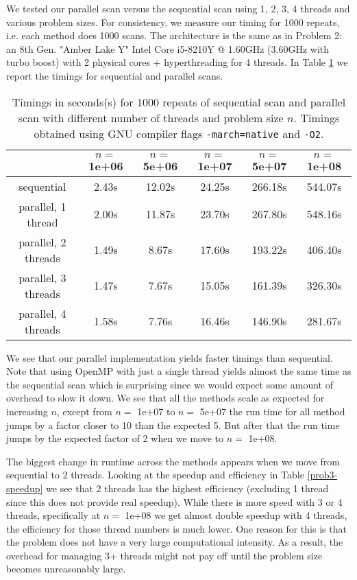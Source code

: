 \documentclass[10pt]{article}
\begin{document}
\begin{enumerate}
We tested our parallel scan versus the sequential scan using 1, 2, 3, 4 threads and various problem sizes. For consistency, we measure our timing for 1000 repeats, i.e. each method does 1000 scans. The architecture is the same as in Problem 2: an 8th Gen. "Amber Lake Y" Intel Core i5-8210Y @ 1.60GHz (3.60GHz with turbo boost) with 2 physical cores + hyperthreading for 4 threads. In Table \ref{prob3-timings} we report the timings for sequential and parallel scans.
\begin{table}[!ht]
\centering
\caption{Timings in seconds(s) for 1000 repeats of sequential scan and parallel scan with different number of threads and problem size $n$. Timings obtained using GNU compiler flags \texttt{-march=native} and \texttt{-O2}.} \label{prob3-timings}
\begin{tabular}{| c | c | c | c | c | c |}
\hline
& $n=$ 1e+06 & $n=$ 5e+06 & $n=$ 1e+07 & $n=$ 5e+07 & $n=$ 1e+08\\
\hline
sequential & 2.43s & 12.02s & 24.25s & 266.18s & 544.07s \\
parallel, 1 thread & 2.00s & 11.87s & 23.70s & 267.80s & 548.16s \\
parallel, 2 threads & 1.49s & 8.67s & 17.60s & 193.22s & 406.40s \\
parallel, 3 threads & 1.47s & 7.67s & 15.05s & 161.39s & 326.30s \\
parallel, 4 threads & 1.58s & 7.76s & 16.46s & 146.90s & 281.67s \\
\hline
\end{tabular}
\end{table}

We see that our parallel implementation yields faster timings than sequential. Note that using OpenMP with just a single thread yields almost the same time as the sequential scan which is surprising since we would expect some amount of overhead to slow it down. We see that all the methods scale as expected for increasing $n$, except from $n=$ 1e+07 to $n=$ 5e+07 the run time for all method jumps by a factor closer to 10 than the expected 5. But after that the run time jumps by the expected factor of 2 when we move to $n=$ 1e+08. 

The biggest change in runtime across the methods appears when we move from sequential to 2 threads. Looking at the speedup and efficiency in Table \ref{prob3-speedup} we see that 2 threads has the highest efficiency (excluding 1 thread since this does not provide real speedup). While there is more speed with 3 or 4 threads, specifically at $n=$ 1e+08 we get almost double speedup with 4 threads, the efficiency for those thread numbers is much lower. One reason for this is that the problem does not have a very large computational intensity. As a result, the overhead for managing 3+ threads might not pay off until the problem size becomes unreasonably large.


\end{enumerate}
\end{document}
